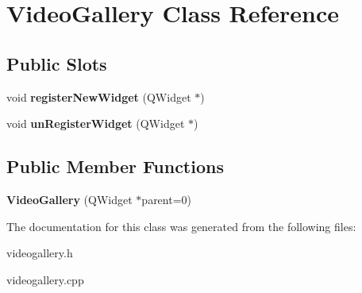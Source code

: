 \hypertarget{class_video_gallery}{
\section{VideoGallery Class Reference}
\label{dc/d09/class_video_gallery}
}
\subsection*{Public Slots}
\begin{DoxyCompactItemize}
\item 
\hypertarget{class_video_gallery_ad25f124c9bf433bdaa104f9638c59399}{
void {\bfseries registerNewWidget} (QWidget $\ast$)}
\label{dc/d09/class_video_gallery_ad25f124c9bf433bdaa104f9638c59399}

\item 
\hypertarget{class_video_gallery_a1be90e78200e971b1b357aa342c23b3e}{
void {\bfseries unRegisterWidget} (QWidget $\ast$)}
\label{dc/d09/class_video_gallery_a1be90e78200e971b1b357aa342c23b3e}

\end{DoxyCompactItemize}
\subsection*{Public Member Functions}
\begin{DoxyCompactItemize}
\item 
\hypertarget{class_video_gallery_aa20be933d1bfef5e9533ea255afc8142}{
{\bfseries VideoGallery} (QWidget $\ast$parent=0)}
\label{dc/d09/class_video_gallery_aa20be933d1bfef5e9533ea255afc8142}

\end{DoxyCompactItemize}


The documentation for this class was generated from the following files:\begin{DoxyCompactItemize}
\item 
videogallery.h\item 
videogallery.cpp\end{DoxyCompactItemize}
